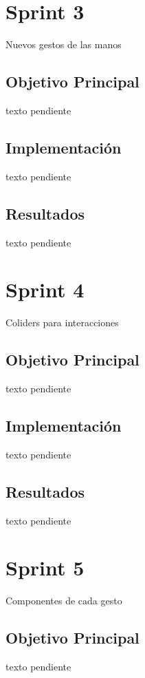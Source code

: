 \documentclass[a4paper, 12pt]{book}
\begin{document}
\section{Sprint 3}
\label{sec:sprint3}
Nuevos gestos de las manos

\subsection{Objetivo Principal}
\label{subsec:objetivo-principal3}
texto pendiente

\subsection{Implementación}
\label{subsec:implementacion3}
texto pendiente

\subsection{Resultados}
\label{subsec:resultados3}
texto pendiente

\section{Sprint 4}
\label{sec:sprint4}
Coliders para interacciones 

\subsection{Objetivo Principal}
\label{subsec:objetivo-principal4}
texto pendiente

\subsection{Implementación}
\label{subsec:implementacion4}
texto pendiente

\subsection{Resultados}
\label{subsec:resultados4}
texto pendiente

\section{Sprint 5}
\label{sec:sprint5}
Componentes de cada gesto

\subsection{Objetivo Principal}
\label{subsec:objetivo-principal5}
texto pendiente
\end{document}
